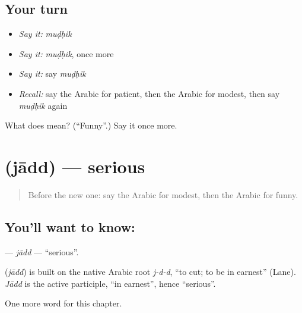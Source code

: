 \subsection*{Your turn}
\begin{itemize}
\raggedright
  \item \emph{Say it:} \emph{muḍḥik}
  \item \emph{Say it:} \emph{muḍḥik}, once more
  \item \emph{Say it:} say \emph{muḍḥik}
  \item \emph{Recall:} say the Arabic for patient, then the Arabic for modest, then say \emph{muḍḥik} again
\end{itemize}

\begin{tcolorbox}[breakable,colback=teal!4,colframe=teal!35!black,title={Before you move on}]
What does  mean? (\textquotedblleft{}Funny\textquotedblright{}.) Say it once more.
\end{tcolorbox}
\section[\texorpdfstring{\ar{جاد} (jādd)}{جاد (jādd)}]{ (jādd) — serious}

\label{lesson:AR-C241-jadd}



\begin{quote}
Before the new one: say the Arabic for modest, then the Arabic for funny.
\end{quote}

\subsection*{You'll want to know: }
\textbf{} — \emph{jādd} — \textquotedblleft{}serious\textquotedblright{}.

\begin{cousinweb}
\textbf{} (\emph{jādd}) is built on the native Arabic root \emph{j-d-d}, \textquotedblleft{}to cut; to be in earnest\textquotedblright{} (Lane). \emph{Jādd} is the active participle, \textquotedblleft{}in earnest\textquotedblright{}, hence \textquotedblleft{}serious\textquotedblright{}.
\end{cousinweb}

\begin{grammarlens}[title={What you've built}]
One more word for this chapter.
\end{grammarlens}

